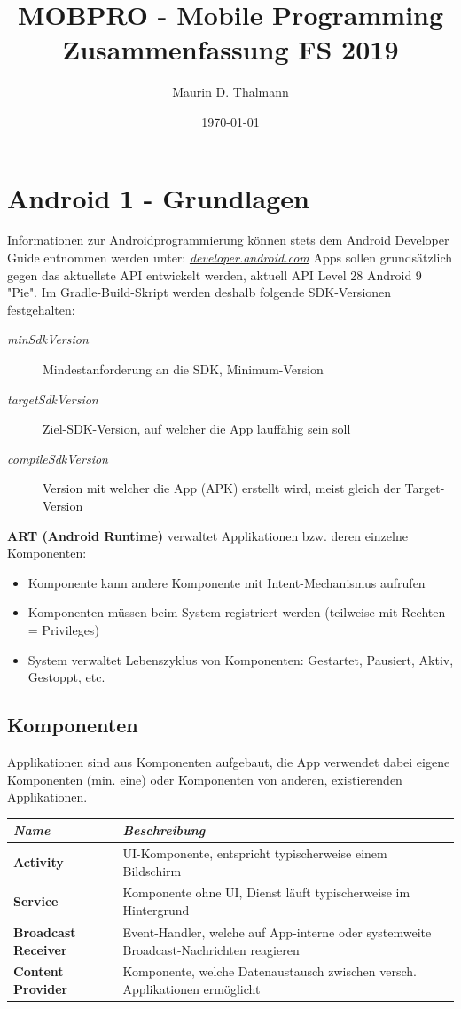 \documentclass[a4paper]{article}
\title{\textbf{MOBPRO - Mobile Programming\\
Zusammenfassung FS 2019}}
\date{\today}
\author{Maurin D. Thalmann}
\begin{document}
	\maketitle
	\newpage
	\tableofcontents
	\newpage
	
	\section{Android 1 - Grundlagen}
	Informationen zur Androidprogrammierung können stets dem Android Developer Guide entnommen werden unter: \textit{\href{https://developer.android.com/}{developer.android.com}}
	Apps sollen grundsätzlich gegen das aktuellste API entwickelt werden, aktuell API Level 28 Android 9 "Pie".
	Im Gradle-Build-Skript werden deshalb folgende SDK-Versionen festgehalten:
	\begin{description}
		\item[\textit{minSdkVersion}] Mindestanforderung an die SDK, Minimum-Version
		\item[\textit{targetSdkVersion}] Ziel-SDK-Version, auf welcher die App lauffähig sein soll
		\item[\textit{compileSdkVersion}] Version mit welcher die App (APK) erstellt wird, meist gleich der Target-Version	
	\end{description}
	\textbf{ART (Android Runtime)} verwaltet Applikationen bzw. deren einzelne Komponenten:
	\begin{itemize}
		\item Komponente kann andere Komponente mit Intent-Mechanismus aufrufen
		\item Komponenten müssen beim System registriert werden (teilweise mit Rechten = Privileges)
		\item System verwaltet Lebenszyklus von Komponenten: Gestartet, Pausiert, Aktiv, Gestoppt, etc.
	\end{itemize}
\subsection{Komponenten}
	Applikationen sind aus Komponenten aufgebaut, die App verwendet dabei eigene Komponenten (min. eine) oder Komponenten von anderen, existierenden Applikationen.
\begin{table}[h!]
	\begin{tabular}{ l | p{11cm} }
		\textbf{\textit{Name}}               & \textbf{\textit{Beschreibung}} \\
		\hline
		\textbf{Activity}           & UI-Komponente, entspricht typischerweise einem Bildschirm \\
		\textbf{Service}            & Komponente ohne UI, Dienst läuft typischerweise im Hintergrund \\
		\textbf{Broadcast Receiver} & Event-Handler, welche auf App-interne oder systemweite Broadcast-Nachrichten reagieren \\
		\textbf{Content Provider}   & Komponente, welche Datenaustausch zwischen versch. Applikationen ermöglicht
	\end{tabular}
\end{table}
\end{document}
